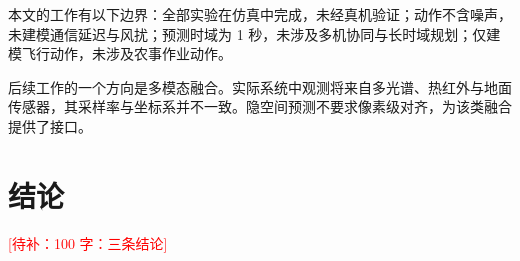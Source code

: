 \documentclass[12pt,a4paper]{ctexart}
\newcommand{\todo}[1]{\textcolor{red}{[待补：#1]}}
\begin{document}
本文的工作有以下边界：全部实验在仿真中完成，未经真机验证；动作不含噪声，未建模通信延迟与风扰；预测时域为 1 秒，未涉及多机协同与长时域规划；仅建模飞行动作，未涉及农事作业动作。

后续工作的一个方向是多模态融合。实际系统中观测将来自多光谱、热红外与地面传感器，其采样率与坐标系并不一致。隐空间预测不要求像素级对齐，为该类融合提供了接口。

\section{结论}

\todo{100 字：三条结论}



\end{document}
